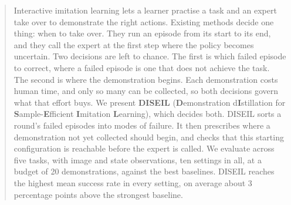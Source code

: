 \begin{abstract}
Interactive imitation learning lets a learner practise a task and an expert take
over to demonstrate the right actions. Existing methods decide one thing: when to
take over. They run an episode from its start to its end, and they call the expert
at the first step where the policy becomes uncertain. Two decisions are left to
chance. The first is which failed episode to correct, where a failed episode is one
that does not achieve the task. The second is where the demonstration begins. Each
demonstration costs human time, and only so many can be collected, so both
decisions govern what that effort buys. We present \textbf{DISEIL}
(\textbf{D}emonstration d\textbf{I}stillation for \textbf{S}ample-\textbf{E}fficient
\textbf{I}mitation \textbf{L}earning), which decides both. DISEIL sorts a round's
failed episodes into modes of failure. It then prescribes where a demonstration not
yet collected should begin, and checks that this starting configuration is
reachable before the expert is called. We evaluate across five tasks, with image
and state observations, ten settings in all, at a budget of 20 demonstrations,
against the best baselines. DISEIL reaches the highest mean success rate in every
setting, on average about 3 percentage points above the strongest baseline.
\end{abstract}
